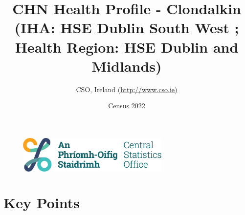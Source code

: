 \documentclass{article}
\title{CHN Health Profile - Clondalkin (IHA: HSE Dublin South West ;  Health Region: HSE Dublin and Midlands) }
\date{Census 2022}
\author{CSO, Ireland  (\url{http://www.cso.ie)}}
\begin{document}


\begin{figure}
	\centering
\includegraphics[width =75mm]{../figures/CSO_Logo.png}
\end{figure}

				 
		   
						  
														  
																																													
												 
			 
\maketitle
					
													   
				 
						 
																																																																											   
				 
				  
  \pagebreak
    	    \tableofcontents

\pagebreak


\section{Key Points}
\end{document}
